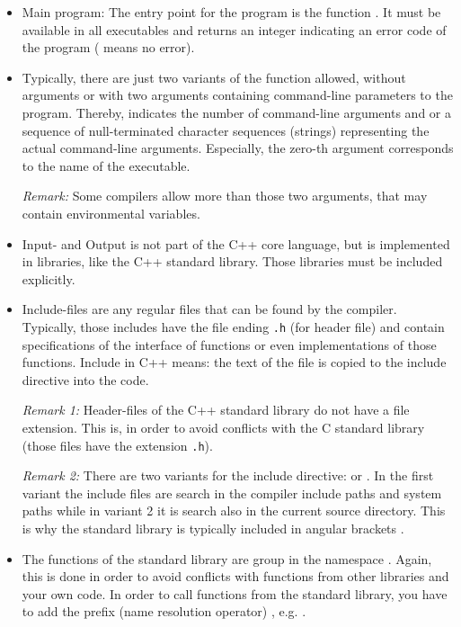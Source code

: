\begin{itemize}
  \item Main program: The entry point for the program is the function . It must be available in all executables and returns an
        integer indicating an error code of the program ( means no error).

  \item Typically, there are just two variants of the  function allowed, without arguments or with two arguments containing
        command-line parameters to the program. Thereby,  indicates the number of command-line arguments and 
        or  a sequence of null-terminated character sequences (strings) representing the actual command-line arguments.
        Especially, the zero-th argument  corresponds to the name of the executable.

        \textit{Remark:} Some compilers allow more than those two arguments, that may contain environmental variables.
  \item Input- and Output is not part of the C++ core language, but is implemented in libraries, like the C++ standard library. Those libraries
        must be included explicitly.

  \item Include-files are any regular files that can be found by the compiler. Typically, those includes have the file ending \texttt{.h}
        (for header file) and contain specifications of the interface of functions or even implementations of those functions.
        Include in C++ means: the text of the file is copied to the include directive  into the code.

        \textit{Remark 1:} Header-files of the C++ standard library do not have a file extension. This is, in order to avoid conflicts with the
        C standard library (those files have the extension \texttt{.h}).

        \textit{Remark 2:} There are two variants for the include directive:  or . In the
        first variant the include files are search in the compiler include paths and system paths while in variant 2 it is search also in the
        current source directory. This is why the standard library is typically included in angular brackets .

  \item The functions of the standard library are group in the namespace . Again, this is done in order to avoid conflicts with functions
        from other libraries and your own code. In order to call functions from the standard library, you have to add the prefix
        (name resolution operator) \cpp{::}, e.g. .


\end{itemize}
